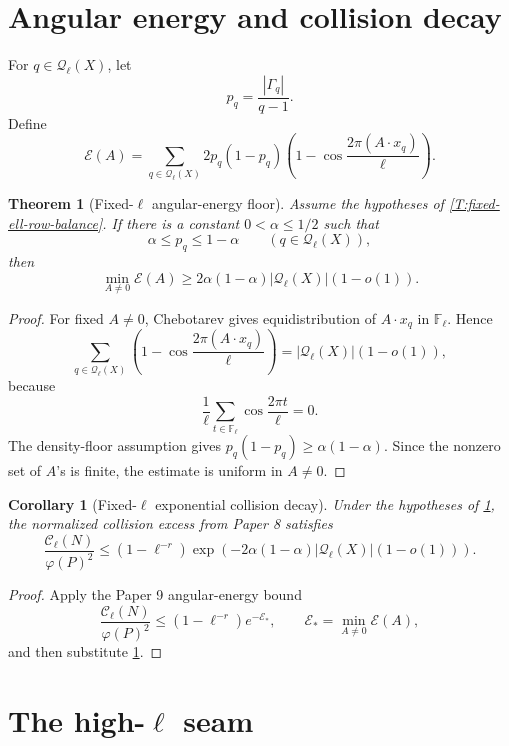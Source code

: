 \documentclass[11pt]{article}
\newtheorem{theorem}{Theorem}
\newtheorem{corollary}{Corollary}
\newcommand{\F}{\mathbb F}
\begin{document}
\section{Angular energy and collision decay}

For \(q\in\mathcal Q_\ell(X)\), let
\[
p_q=\frac{|\Gamma_q|}{q-1}.
\]
Define
\[
\mathcal E(A)=
\sum_{q\in\mathcal Q_\ell(X)}
2p_q(1-p_q)
\left(1-\cos\frac{2\pi(A\cdot x_q)}{\ell}\right).
\]

\begin{theorem}[Fixed-\(\ell\) angular-energy floor]\label{T:fixed-ell-energy}
Assume the hypotheses of \cref{T:fixed-ell-row-balance}.  If there is a constant \(0<\alpha\le1/2\) such that
\[
\alpha\le p_q\le1-\alpha
\qquad(q\in\mathcal Q_\ell(X)),
\]
then
\[
\min_{A\ne0}\mathcal E(A)
\ge
2\alpha(1-\alpha)|\mathcal Q_\ell(X)|(1-o(1)).
\]
\end{theorem}

\begin{proof}
For fixed \(A\ne0\), Chebotarev gives equidistribution of \(A\cdot x_q\) in \(\F_\ell\).  Hence
\[
\sum_{q\in\mathcal Q_\ell(X)}
\left(1-\cos\frac{2\pi(A\cdot x_q)}{\ell}\right)
=
|\mathcal Q_\ell(X)|(1-o(1)),
\]
because
\[
\frac1\ell\sum_{t\in\F_\ell}\cos\frac{2\pi t}{\ell}=0.
\]
The density-floor assumption gives \(p_q(1-p_q)\ge\alpha(1-\alpha)\).  Since the nonzero set of \(A\)'s is finite, the estimate is uniform in \(A\ne0\).
\end{proof}

\begin{corollary}[Fixed-\(\ell\) exponential collision decay]\label{C:fixed-ell-decay}
Under the hypotheses of \cref{T:fixed-ell-energy}, the normalized collision excess from Paper 8 satisfies
\[
\frac{\mathcal C_\ell(N)}{\varphi(P)^2}
\le
(1-\ell^{-r})
\exp\left(-2\alpha(1-\alpha)|\mathcal Q_\ell(X)|(1-o(1))\right).
\]
\end{corollary}

\begin{proof}
Apply the Paper 9 angular-energy bound
\[
\frac{\mathcal C_\ell(N)}{\varphi(P)^2}
\le
(1-\ell^{-r})e^{-\mathcal E_*},
\qquad
\mathcal E_*=\min_{A\ne0}\mathcal E(A),
\]
and then substitute \cref{T:fixed-ell-energy}.
\end{proof}

\section{The high-\texorpdfstring{\(\ell\)}{ell} seam}
\end{document}
